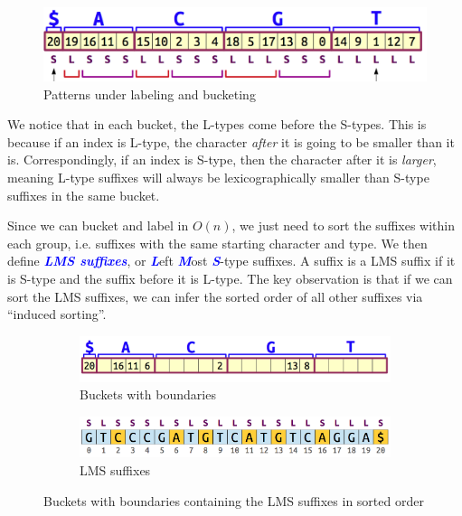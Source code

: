 \documentclass[11pt, oneside]{article}
\newcommand{\emphasis}[1]{\textcolor{blue}{\textbf{\textit{#1}}}}
\begin{document}
\begin{figure}[h!]
\centering
\includegraphics[scale=0.4]{blabel}
\caption{Patterns under labeling and bucketing}
\end{figure}

We notice that in each bucket, the L-types come before the S-types.
This is because if an index is L-type, the character \textit{after} it is going to be smaller than it is.
Correspondingly, if an index is S-type, then the character after it is \textit{larger},
meaning L-type suffixes will always be lexicographically smaller than S-type suffixes in the same bucket.

Since we can bucket and label in \( O(n) \), we just need to sort the suffixes
within each group, i.e. suffixes with the same starting character and type.
We then define \emphasis{LMS suffixes}, or \emphasis{L}eft \emphasis{M}ost \emphasis{S}-type suffixes.
A suffix is a LMS suffix if it is S-type and the suffix before it is L-type.
The key observation is that if we can sort the LMS suffixes, we can
infer the sorted order of all other suffixes via ``induced sorting''.

\begin{figure}[h!]
    \centering
    \begin{subfigure}[h]{\textwidth}
      \centering
      \includegraphics[scale=0.35]{bbucket}
      \caption{Buckets with boundaries}
    \end{subfigure}
    \newline
    \begin{subfigure}[h]{\textwidth}
      \centering
      \includegraphics[scale=0.35]{lms}
      \caption{LMS suffixes}
    \end{subfigure}
    \caption{Buckets with boundaries containing the LMS suffixes in sorted order}
\end{figure}
\end{document}
